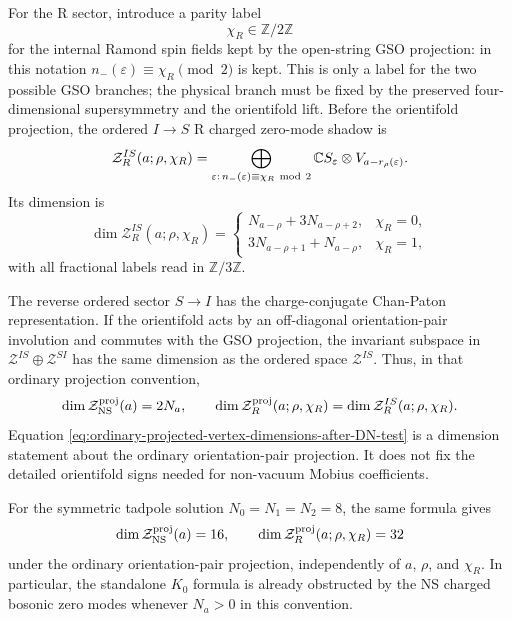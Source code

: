 \documentclass[11pt]{article}
\newcommand{\C}{\mathbb{C}}
\newcommand{\Z}{\mathbb{Z}}
\newcommand{\NS}{\mathrm{NS}}
\begin{document}
For the R sector, introduce a parity label
\begin{equation}
  \chi_R\in\Z/2\Z
  \label{eq:R-GSO-parity-label}
\end{equation}
for the internal Ramond spin fields kept by the open-string GSO projection: in this notation
\(n_-(\varepsilon)\equiv\chi_R\pmod 2\) is kept. This is only a label for the two possible
GSO branches; the physical branch must be fixed by the preserved four-dimensional
supersymmetry and the orientifold lift. Before the orientifold projection, the ordered
\(I\to S\) R charged zero-mode shadow is
\begin{equation}
  \mathcal Z_{R}^{IS}(a;\rho,\chi_R)
  =
  \bigoplus_{\varepsilon:\,n_-(\varepsilon)\equiv\chi_R\ {\rm mod}\ 2}
  \C S_\varepsilon\otimes V_{a-r_\rho(\varepsilon)} .
  \label{eq:R-zero-mode-space-after-DN-test}
\end{equation}
Its dimension is
\begin{equation}
  \dim \mathcal Z_{R}^{IS}(a;\rho,\chi_R)
  =
  \begin{cases}
    N_{a-\rho}+3N_{a-\rho+2}, & \chi_R=0,\\[3pt]
    3N_{a-\rho+1}+N_{a-\rho}, & \chi_R=1,
  \end{cases}
  \label{eq:R-zero-mode-dimension-after-DN-test}
\end{equation}
with all fractional labels read in \(\Z/3\Z\).

The reverse ordered sector \(S\to I\) has the charge-conjugate Chan-Paton representation. If
the orientifold acts by an off-diagonal orientation-pair involution and commutes with the GSO
projection, the invariant subspace in
\(\mathcal Z^{IS}\oplus \mathcal Z^{SI}\) has the same dimension as the ordered space
\(\mathcal Z^{IS}\). Thus, in that ordinary projection convention,
\begin{equation}
  \dim \mathcal Z_{\NS}^{\rm proj}(a)=2N_a,
  \qquad
  \dim \mathcal Z_{R}^{\rm proj}(a;\rho,\chi_R)
  =
  \dim \mathcal Z_{R}^{IS}(a;\rho,\chi_R).
  \label{eq:ordinary-projected-vertex-dimensions-after-DN-test}
\end{equation}
Equation \eqref{eq:ordinary-projected-vertex-dimensions-after-DN-test} is a dimension statement
about the ordinary orientation-pair projection. It does not fix the detailed orientifold signs
needed for non-vacuum Mobius coefficients.

For the symmetric tadpole solution \(N_0=N_1=N_2=8\), the same formula gives
\begin{equation}
  \dim \mathcal Z_{\NS}^{\rm proj}(a)=16,
  \qquad
  \dim \mathcal Z_{R}^{\rm proj}(a;\rho,\chi_R)=32
  \label{eq:symmetric-projected-vertex-dimensions-after-DN-test}
\end{equation}
under the ordinary orientation-pair projection, independently of \(a\), \(\rho\), and
\(\chi_R\). In particular, the standalone \(K_0\) formula is already obstructed by the NS
charged bosonic zero modes whenever \(N_a>0\) in this convention.
\end{document}
